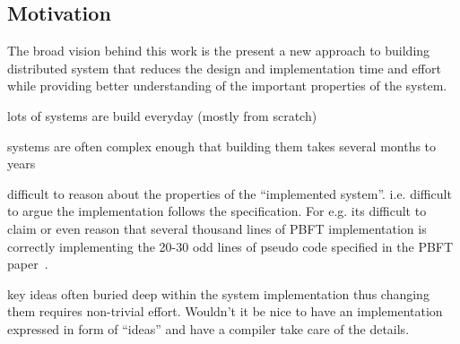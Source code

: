 
\subsection{Motivation}

The broad vision behind this work is the present a new approach to building distributed system that reduces the design and implementation time and effort while providing better understanding of the important properties of the system. 

\bi
\item lots of systems are build everyday (mostly from scratch)
\item systems are often complex enough that building them takes several months to years
\item difficult to reason about the properties of the ``implemented system''. i.e. difficult to argue the implementation follows the specification. For e.g. its difficult to claim or even reason that several thousand lines of PBFT implementation is correctly implementing the 20-30 odd lines of pseudo code specified in the PBFT paper~\cite{castr99}.
\item key ideas often buried deep within the system implementation thus changing them requires non-trivial effort. Wouldn't it be nice to have an implementation expressed in form of ``ideas'' and have a compiler take care of the details.
\ei

